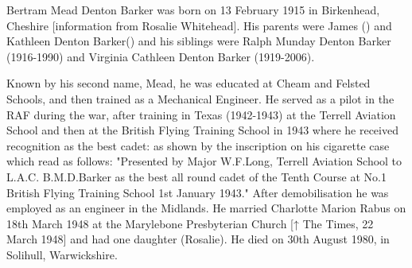 
Bertram Mead Denton Barker was born on 13 February 1915 in Birkenhead, Cheshire [information from Rosalie Whitehead].  His parents were James () and Kathleen Denton Barker() and his siblings were Ralph Munday Denton Barker (1916-1990) and Virginia Cathleen Denton Barker (1919-2006).

Known by his second name, Mead, he was educated at Cheam and Felsted Schools, and then trained as a Mechanical Engineer. He served as a pilot in the RAF during the war,  after training in Texas (1942-1943) at the Terrell Aviation School and then at the British Flying Training School in 1943 where he  received recognition as the best cadet:  as shown by the inscription on his cigarette case which read as follows:
"Presented by Major W.F.Long, Terrell Aviation School to
L.A.C. B.M.D.Barker as the best all round cadet of the Tenth Course at No.1
British Flying Training School 1st January 1943."
 After demobilisation he was employed as an engineer in the Midlands. He married Charlotte Marion Rabus on 18th March 1948 at the Marylebone Presbyterian Church [↑ The Times, 22 March 1948] and had one daughter (Rosalie). 
He died on 30th August 1980, in Solihull, Warwickshire. 

